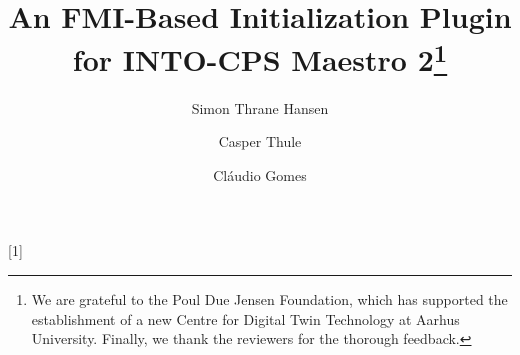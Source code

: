 \documentclass[runningheads]{llncs}
\begin{document}
[1]{%
  \def\tikz@width{#1}%
  \def\tikzscale{1}\begin{lrbox}{\measure@tikzpicture}%
  \BODY
  \end{lrbox}%
  \edef\tikzscale{\pgfmathresult}%
  \BODY
}
%
\title{An FMI-Based Initialization Plugin for INTO-CPS Maestro 2\thanks{We are grateful to the Poul Due Jensen Foundation, which has supported the establishment of a new Centre for Digital Twin Technology at Aarhus University. Finally, we thank the reviewers for the thorough feedback.}}

%
%
\author{Simon Thrane Hansen  \and
Casper Thule  \and
Cláudio Gomes  }
%
%
%

\maketitle              %
%
















%



\end{document}
